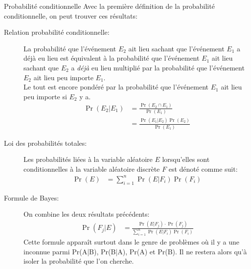 \documentclass[10pt, french]{article}
\begin{document}
\begin{multicols*}{2}
\begin{probch3}{Probabilité conditionnelle}
Avec la première définition de la probabilité conditionnelle, on peut trouver ces résultats:
\begin{description}
	\item[Relation probabilité conditionnelle: ]	La probabilité que l'événement $E_{2}$ ait lieu sachant que l'événement $E_{1}$ a déjà eu lieu est équivalent à la probabilité que l'événement $E_{1}$ ait lieu sachant que $E_{2}$ a \textit{déjà} eu lieu multiplié par la probabilité que l'événement $E_{2}$ ait lieu peu importe $E_{1}$. \\
	Le tout est encore pondéré par la probabilité que l'événement $E_{1}$ ait lieu peu importe si $E_{2}$ y a.
	\begin{align*}
		\Pr(E_{2} | E_{1})
		&= 	\frac{\Pr(E_{2} \cap E_{1})}{\Pr(E_{1})}		\\
		&=	\frac{\Pr(E_{1} | E_{2}) \Pr(E_{2})}{\Pr(E_{1})}		
	\end{align*}
	\item[Loi des probabilités totales: ]	Les probabilités liées à la variable aléatoire $E$ lorsqu'elles sont conditionnelles à la variable aléatoire discrète $F$ est dénoté comme suit:
	\begin{align*}
		\Pr(E)	&=	\sum_{i = 1}^{n} \Pr(E | F_{i}) \Pr(F_{i})
	\end{align*}
	\item[Formule de Bayes: ]	On combine les deux résultats précédents:
	\begin{align*}
		\Pr(F_{j} | E) 
		&=	\frac{\Pr(E | F_{j}) \cdot \Pr(F_{j})}{\sum_{i = 1}^{n} \Pr(E | F_{i}) \Pr(F_{i})}
	\end{align*}
	Cette formule apparaît surtout dans le genre de problèmes où il y a une inconnue parmi Pr(A|B), Pr(B|A), Pr(A) et Pr(B). Il ne restera alors qu'à isoler la probabilité que l'on cherche.
\end{description}
\end{probch3}



\pagebreak

\end{multicols*}
\end{document}
